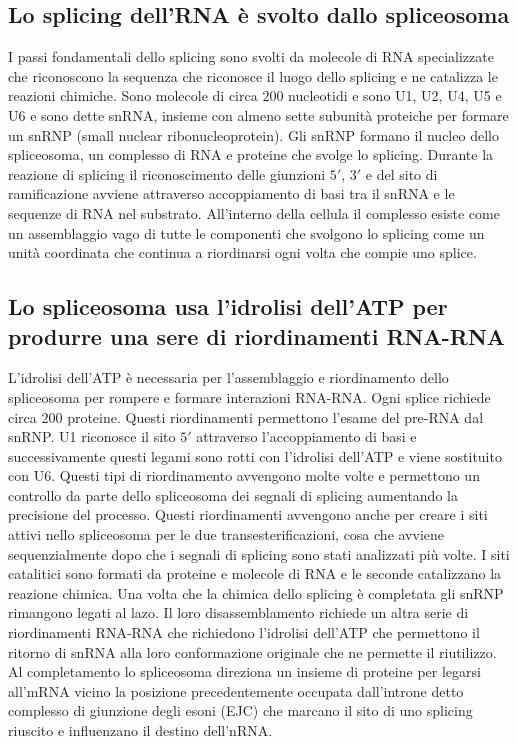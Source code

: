 \subsection{Lo splicing dell'RNA \`e svolto dallo spliceosoma}
I passi fondamentali dello splicing sono svolti da molecole di RNA specializzate che riconoscono la sequenza che riconosce il luogo dello splicing e ne catalizza le reazioni chimiche. 
Sono molecole di circa $200$ nucleotidi e sono U1, U2, U4, U5 e U6 e sono dette snRNA, insieme con almeno sette subunit\`a proteiche per formare un snRNP (small nuclear 
ribonucleoprotein). Gli snRNP formano il nucleo dello spliceosoma, un complesso di RNA e proteine che svolge lo splicing. Durante la reazione di splicing il riconoscimento delle
giunzioni $5'$, $3'$ e del sito di ramificazione avviene attraverso accoppiamento di basi tra il snRNA e le sequenze di RNA nel substrato. All'interno della cellula il complesso esiste
come un assemblaggio vago di tutte le componenti che svolgono lo splicing come un unit\`a coordinata che continua a riordinarsi ogni volta che compie uno splice. 
\subsection{Lo spliceosoma usa l'idrolisi dell'ATP per produrre una sere di riordinamenti RNA-RNA}
L'idrolisi dell'ATP \`e necessaria per l'assemblaggio e riordinamento dello spliceosoma per rompere e formare interazioni RNA-RNA. Ogni splice richiede circa $200$ proteine. Questi
riordinamenti permettono l'esame del pre-RNA dal snRNP. U1 riconosce il sito $5'$ attraverso l'accoppiamento di basi e successivamente questi legami sono rotti con l'idrolisi 
dell'ATP e viene sostituito con U6. Questi tipi di riordinamento avvengono molte volte e permettono un controllo da parte dello spliceosoma dei segnali di splicing aumentando la 
precisione del processo. Questi riordinamenti avvengono anche per creare i siti attivi nello spliceosoma per le due transesterificazioni, cosa che avviene sequenzialmente dopo che i 
segnali di splicing sono stati analizzati pi\`u volte. I siti catalitici sono formati da proteine e molecole di RNA e le seconde catalizzano la reazione chimica. Una volta che la 
chimica dello splicing \`e completata gli snRNP rimangono legati al lazo. Il loro disassemblamento richiede un altra serie di riordinamenti RNA-RNA che richiedono l'idrolisi dell'ATP che
permettono il ritorno di snRNA alla loro conformazione originale che ne permette il riutilizzo. Al completamento lo spliceosoma direziona un insieme di proteine per legarsi all'mRNA
vicino la posizione precedentemente occupata dall'introne detto complesso di giunzione degli esoni (EJC) che marcano il sito di uno splicing riuscito e influenzano il destino dell'nRNA.

